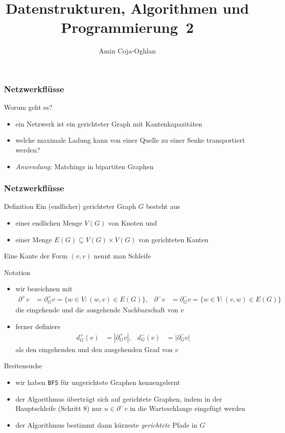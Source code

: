 \documentclass[aspectratio=1610, 11pt]{beamer}
\title{Datenstrukturen, Algorithmen und Programmierung~2}
\author[A.~Coja-Oghlan]{Amin Coja-Oghlan}
\institute[DAP2]{Lehrstuhl Informatik 2\\Fakult\"at f\"ur Informatik}
\newcommand{\mytitle}{Netzwerkfl\"usse}
\begin{document}
\frame[plain]{\titlepage}

\begin{frame}\frametitle{\mytitle}
	\begin{exampleblock}{Worum geht es?}
		\begin{itemize}
			\item ein Netzwerk ist ein gerichteter Graph mit Kantenkapazit\"aten
			\item welche maximale Ladung kann von einer Quelle zu einer Senke transportiert werden?
			\item \emph{Anwendung:} Matchings in bipartiten Graphen
		\end{itemize}
	\end{exampleblock}
\end{frame}

\begin{frame}\frametitle{\mytitle}
	\begin{overprint}
		\begin{block}{Definition}
			Ein (endlicher) \alert{gerichteter Graph} $G$ besteht aus
			\begin{itemize}
				\item einer endlichen Menge $V(G)$ von \alert{Knoten} und
				\item einer Menge $E(G)\subseteq V(G)\times V(G)$ von \alert{gerichteten Kanten}
			\end{itemize}
			Eine Kante der Form $(v,v)$ nennt man \alert{Schleife}
		\end{block}
		\begin{exampleblock}{Notation}
			\begin{itemize}
				\item wir bezeichnen mit
					\begin{align*}
						\partial^+v&=\partial_G^+v=\{w\in V:(w,v)\in E(G)\},&\partial^-v&=\partial_G^-v=\{w\in V:(v,w)\in E(G)\}
					\end{align*}
					die eingehende und die ausgehende Nachbarschaft von $v$
				\item ferner definiere
					\begin{align*}
						d^+_G(v)&=|\partial^+_Gv|,&d^-_G(v)&=|\partial^-_Gv|
					\end{align*}
					als den eingehenden und den ausgehenden Grad von $v$
			\end{itemize}
		\end{exampleblock}
		\begin{exampleblock}{Breitensuche}
			\begin{itemize}
				\item wir haben {\tt BFS} f\"ur ungerichtete Graphen kennengelernt
				\item der Algorithmus \"ubertr\"agt sich auf gerichtete Graphen, indem in der Hauptschleife (Schritt 8) nur $u\in\partial^-v$ in die Warteschlange eingef\"ugt werden
				\item der Algorithmus bestimmt dann k\"urzeste \emph{gerichtete} Pfade in $G$
			\end{itemize}
		\end{exampleblock}
	\end{overprint}
\end{frame}
\end{document}
